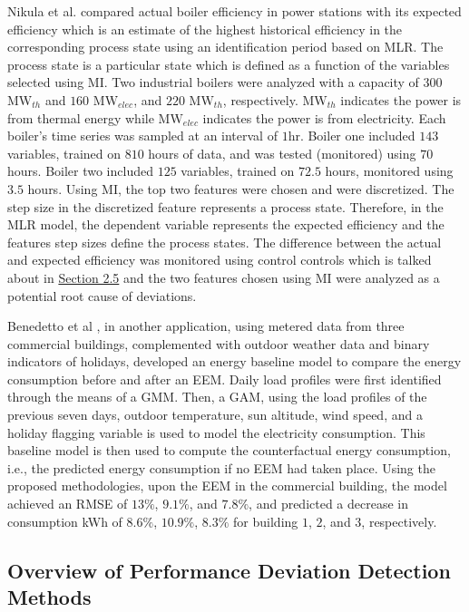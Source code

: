 Nikula et al.\cite{boiler} compared actual boiler efficiency in power stations with its expected efficiency which is an estimate of the highest historical efficiency in the corresponding process state using an identification period based on MLR. The process state is a particular state which is defined as a function of the variables selected using \ac{MI}. Two industrial boilers were analyzed with a capacity of $300$ $\text{MW}_{th}$ and $160$ $\text{MW}_{elec}$, and $220$ $\text{MW}_{th}$, respectively. $\text{MW}_{th}$ indicates the power is from thermal energy while $\text{MW}_{elec}$ indicates the power is from electricity. Each boiler's time series was sampled at an interval of $1$hr. Boiler one included $143$ variables, trained on $810$ hours of data, and was tested (monitored) using $70$ hours. Boiler two included $125$ variables, trained on $72.5$ hours, monitored using $3.5$ hours. Using MI, the top two features were chosen and were discretized. The step size in the discretized feature represents a process state. Therefore, in the MLR model, the dependent variable represents the expected efficiency and the features step sizes define the process states. The difference between the actual and expected efficiency was monitored using control controls which is talked about in \hyperlink{subsection.2.5}{Section 2.5} and the two features chosen using MI were analyzed as a potential root cause of deviations.

Benedetto et al \cite{data-driven-MV}, in another application, using metered data from three commercial buildings, complemented with outdoor weather data and binary indicators of holidays, developed an energy baseline model to compare the energy consumption before and after an \ac{EEM}. Daily load profiles were first identified through the means of a \ac{GMM}. Then, a \ac{GAM}, using the load profiles of the previous seven days, outdoor temperature, sun altitude, wind speed, and a holiday flagging variable is used to model the electricity consumption. This baseline model is then used to compute the counterfactual energy consumption, i.e., the predicted energy consumption if no EEM had taken place. Using the proposed methodologies, upon the EEM in the commercial building, the model achieved an RMSE of $13\%$, $9.1\%$, and $7.8\%$, and predicted a decrease in consumption \ac{kWh} of $8.6\%$, $10.9\%$, $8.3\%$ for building $1$, $2$, and $3$, respectively.

\subsection{Overview of Performance Deviation Detection Methods}

